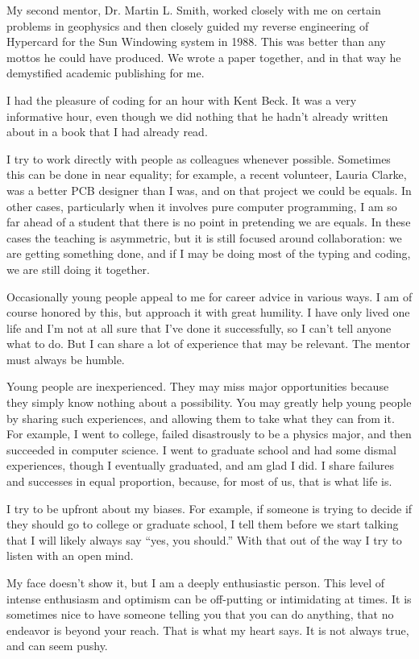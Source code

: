 \documentclass[
	fontsize=10pt, %
	twoside=false, %
	secnumdepth=1, %
]{kaobook}
\begin{document}
My second mentor, Dr. Martin L. Smith, worked closely with me on
certain problems in geophysics and then closely guided my reverse
engineering of Hypercard for the Sun Windowing system in
1988\cite{read1991light}. This
was better than any mottos he could have produced. We wrote a paper
together, and in that way he demystified academic publishing for me.

I had the pleasure of coding for an hour with Kent Beck. It was a very
informative hour, even though we did nothing that he hadn’t already
written about in a book that I had already read.

I try to work directly with people as colleagues whenever
possible. Sometimes this can be done in near equality; for example, a
recent volunteer, Lauria Clarke, was a better PCB designer than I was,
and on that project we could be equals. In other cases, particularly
when it involves pure computer programming, I am so far ahead of a
student that there is no point in pretending we are equals. In these
cases the teaching is asymmetric, but it is still focused around
collaboration: we are getting something done, and if I may be
doing most of the typing and coding, we are still doing it together.

Occasionally young people appeal to me for career advice in various
ways. I am of course honored by this, but approach it with great
humility. I have only lived one life and I’m not at all sure that I’ve
done it successfully, so I can’t tell anyone what to do. But I can
share a lot of experience that may be relevant. The mentor must always
be humble.

Young people are inexperienced. They may miss major opportunities
because they simply know nothing about a possibility. You may greatly
help young people by sharing such experiences, and allowing them to
take what they can from it. For example, I went to college, failed
disastrously to be a physics major, and then succeeded in computer
science. I went to graduate school and had some dismal experiences,
though I eventually graduated, and am glad I did. I share failures and
successes in equal proportion, because, for most of us, that is what
life is.

I try to be upfront about my biases. For example, if someone is trying
to decide if they should go to college or graduate school, I tell them
before we start talking that I will likely always say “yes, you
should.” With that out of the way I try to listen with an open mind.

My face doesn’t show it, but I am a deeply enthusiastic person. This
level of intense enthusiasm and optimism can be off-putting
or intimidating at times.
It is sometimes nice to have someone telling you that you
can do anything, that no endeavor is beyond your reach.
That is what my heart says. It is not always true, and can seem pushy.
\end{document}
